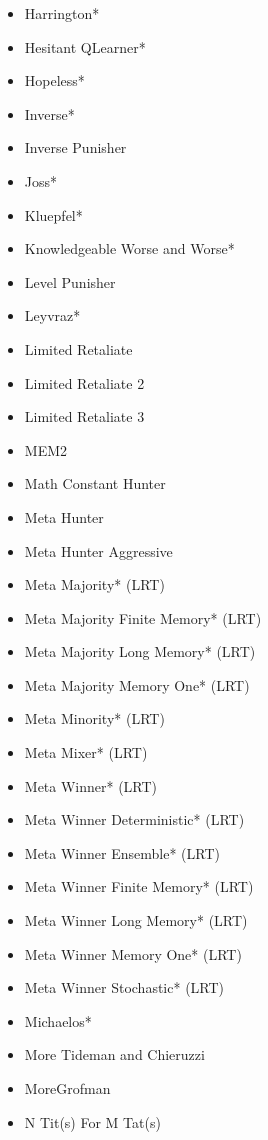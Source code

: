 \begin{appendices}
\begin{multicols}{4}
\begin{itemize}
            \item Harrington*
            \item Hesitant QLearner*
            \item Hopeless*
            \item Inverse*
            \item Inverse Punisher
            \item Joss*
            \item Kluepfel*
            \item Knowledgeable Worse and Worse*
            \item Level Punisher
            \item Leyvraz*
            \item Limited Retaliate
            \item Limited Retaliate 2
            \item Limited Retaliate 3
            \item MEM2
            \item Math Constant Hunter
            \item Meta Hunter
            \item Meta Hunter Aggressive
            \item Meta Majority* (LRT)
            \item Meta Majority Finite Memory* (LRT)
            \item Meta Majority Long Memory* (LRT)
            \item Meta Majority Memory One* (LRT)
            \item Meta Minority* (LRT)
            \item Meta Mixer* (LRT)
            \item Meta Winner* (LRT)
            \item Meta Winner Deterministic* (LRT)
            \item Meta Winner Ensemble* (LRT)
            \item Meta Winner Finite Memory* (LRT)
            \item Meta Winner Long Memory* (LRT)
            \item Meta Winner Memory One* (LRT)
            \item Meta Winner Stochastic* (LRT)
            \item Michaelos*
            \item More Tideman and Chieruzzi
            \item MoreGrofman
            \item N Tit(s) For M Tat(s)

\end{itemize}
\end{multicols}
\end{appendices}
